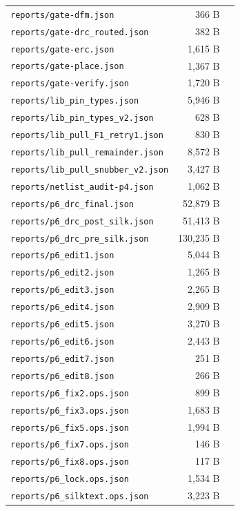 \documentclass[11pt,a4paper]{article}
\begin{document}
{\begin{longtable}{p{9cm}rp{4cm}}
\texttt{reports/gate-dfm.json} & 366 B &  \\
\texttt{reports/gate-drc\_routed.json} & 382 B &  \\
\texttt{reports/gate-erc.json} & 1,615 B &  \\
\texttt{reports/gate-place.json} & 1,367 B &  \\
\texttt{reports/gate-verify.json} & 1,720 B &  \\
\texttt{reports/lib\_pin\_types.json} & 5,946 B &  \\
\texttt{reports/lib\_pin\_types\_v2.json} & 628 B &  \\
\texttt{reports/lib\_pull\_F1\_retry1.json} & 830 B &  \\
\texttt{reports/lib\_pull\_remainder.json} & 8,572 B &  \\
\texttt{reports/lib\_pull\_snubber\_v2.json} & 3,427 B &  \\
\texttt{reports/netlist\_audit-p4.json} & 1,062 B &  \\
\texttt{reports/p6\_drc\_final.json} & 52,879 B &  \\
\texttt{reports/p6\_drc\_post\_silk.json} & 51,413 B &  \\
\texttt{reports/p6\_drc\_pre\_silk.json} & 130,235 B &  \\
\texttt{reports/p6\_edit1.json} & 5,044 B &  \\
\texttt{reports/p6\_edit2.json} & 1,265 B &  \\
\texttt{reports/p6\_edit3.json} & 2,265 B &  \\
\texttt{reports/p6\_edit4.json} & 2,909 B &  \\
\texttt{reports/p6\_edit5.json} & 3,270 B &  \\
\texttt{reports/p6\_edit6.json} & 2,443 B &  \\
\texttt{reports/p6\_edit7.json} & 251 B &  \\
\texttt{reports/p6\_edit8.json} & 266 B &  \\
\texttt{reports/p6\_fix2.ops.json} & 899 B &  \\
\texttt{reports/p6\_fix3.ops.json} & 1,683 B &  \\
\texttt{reports/p6\_fix5.ops.json} & 1,994 B &  \\
\texttt{reports/p6\_fix7.ops.json} & 146 B &  \\
\texttt{reports/p6\_fix8.ops.json} & 117 B &  \\
\texttt{reports/p6\_lock.ops.json} & 1,534 B &  \\
\texttt{reports/p6\_silktext.ops.json} & 3,223 B &  \\

\end{longtable}}
\end{document}
